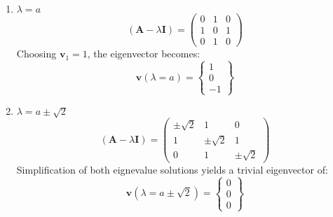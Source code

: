\begin{enumerate}
\item $\lambda=a$
		\begin{equation*}
		\left(\boldsymbol{A}-\lambda\boldsymbol{I}\right)=
		\begin{pmatrix}
			0&1&0\\1&0&1\\0&1&0
		\end{pmatrix}
		\end{equation*}
Choosing $\boldsymbol{v}_1=1$, the eigenvector becomes:
		\begin{equation*}
	\boxed{
			\boldsymbol{v}\left(\lambda=a\right)=
		\begin{Bmatrix}
			1\\0\\-1
		\end{Bmatrix}}
	\end{equation*}
	
\item $\lambda=a\pm\sqrt{2}$
		\begin{equation*}
		\left(\boldsymbol{A}-\lambda\boldsymbol{I}\right)=
		\begin{pmatrix}
			\pm\sqrt{2}&1&0\\1&\pm\sqrt{2}&1\\0&1&\pm\sqrt{2}
		\end{pmatrix}
		\end{equation*}
		Simplification of both eignevalue solutions yields a trivial eigenvector of:
				\begin{equation*}
	\boxed{
			\boldsymbol{v}\left(\lambda=a\pm\sqrt{2}\right)=
		\begin{Bmatrix}
			0\\0\\0
		\end{Bmatrix}}
	\end{equation*}
\end{enumerate}